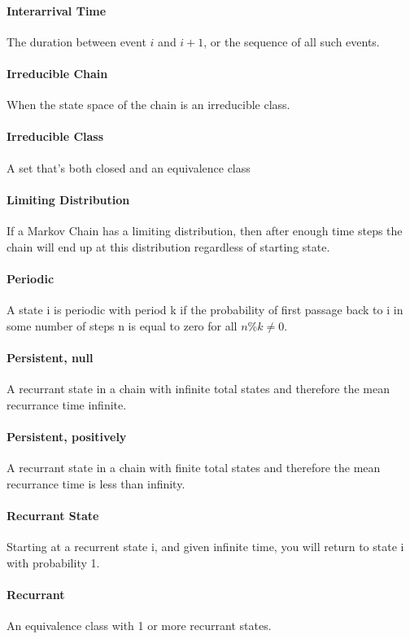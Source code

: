     \paragraph{Interarrival Time} The duration between event \(i\) and \(i+1\), or the sequence of all such events.
    \paragraph{Irreducible Chain} When the state space of the chain is an irreducible class.
    \paragraph{Irreducible Class} A set that's both closed and an equivalence class
    \paragraph{Limiting Distribution} If a Markov Chain has a limiting distribution, then after enough time steps the chain will end up at this distribution regardless of starting state.
    \paragraph{Periodic} A state i is periodic with period k if the probability of first passage back to i in some number of steps n is equal to zero for all \(n \% k \ne 0\).
    \paragraph{Persistent, null} A recurrant state in a chain with infinite total states and therefore the mean recurrance time infinite.
    \paragraph{Persistent, positively} A recurrant state in a chain with finite total states and therefore the mean recurrance time is less than infinity.
    \paragraph{Recurrant State} Starting at a recurrent state i, and given infinite time, you will return to state i with probability 1.
    \paragraph{Recurrant} An equivalence class with 1 or more recurrant states.
